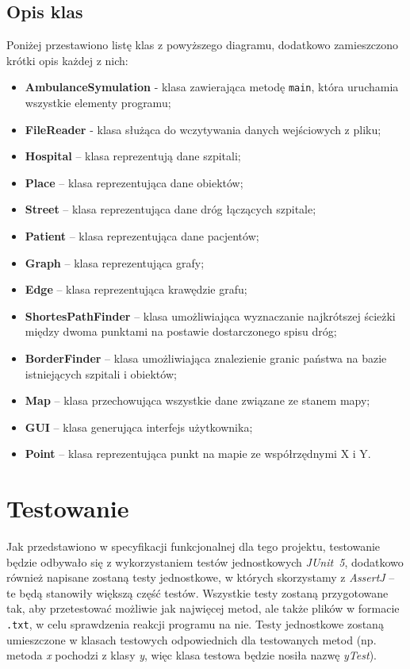 \documentclass[12pt,a4paper]{article}
\begin{document}
\subsection{Opis klas}
Poniżej przestawiono listę klas z powyższego diagramu, dodatkowo zamieszczono krótki opis każdej z nich:
\begin{itemize}
\item \textbf{AmbulanceSymulation} - klasa zawierająca metodę \texttt{main}, która uruchamia wszystkie elementy programu;
\item \textbf{FileReader} - klasa służąca do wczytywania danych wejściowych z pliku;
\item \textbf{Hospital} – klasa reprezentują dane szpitali;
\item \textbf{Place} – klasa reprezentująca dane obiektów;
\item \textbf{Street} – klasa reprezentująca dane dróg łączących szpitale;
\item \textbf{Patient} – klasa reprezentująca dane pacjentów;
\item \textbf{Graph} – klasa reprezentująca grafy;
\item \textbf{Edge} – klasa reprezentująca krawędzie grafu;
\item \textbf{ShortesPathFinder} – klasa umożliwiająca wyznaczanie najkrótszej ścieżki między dwoma punktami na postawie dostarczonego spisu dróg;
\item \textbf{BorderFinder} – klasa umożliwiająca znalezienie granic państwa na bazie istniejących szpitali i obiektów;
\item \textbf{Map} – klasa przechowująca wszystkie dane związane ze stanem mapy;
\item \textbf{GUI} – klasa generująca interfejs użytkownika;
\item \textbf{Point} – klasa reprezentująca punkt na mapie ze współrzędnymi X i Y.
\end{itemize}

\section{Testowanie}
Jak przedstawiono w specyfikacji funkcjonalnej dla tego projektu, testowanie będzie odbywało się z wykorzystaniem testów jednostkowych \textit{JUnit~5}, dodatkowo również napisane zostaną testy jednostkowe, w których skorzystamy z \textit{AssertJ} – te będą stanowiły większą część testów. Wszystkie testy zostaną przygotowane tak, aby przetestować możliwie jak najwięcej metod, ale także plików w formacie \texttt{.txt}, w celu sprawdzenia reakcji programu na nie. Testy jednostkowe zostaną umieszczone w klasach testowych odpowiednich dla testowanych metod (np. metoda \textit{x} pochodzi z klasy \textit{y}, więc klasa testowa będzie nosiła nazwę \textit{yTest}).
\end{document}
